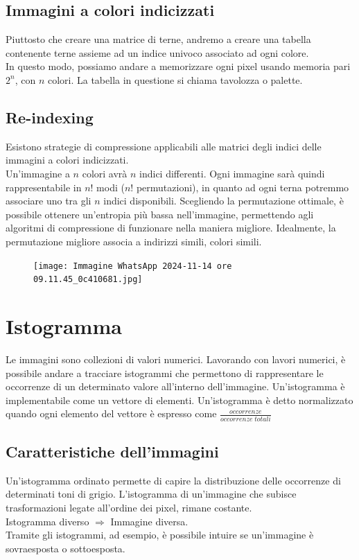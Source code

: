 \documentclass{report}
\begin{document}
	\section{Immagini a colori indicizzati}
	Piuttosto che creare una matrice di terne, andremo a creare una tabella contenente terne assieme ad un indice univoco associato ad ogni colore.\\
	In questo modo, possiamo andare a memorizzare ogni pixel usando memoria pari $2^n$, con $n$ colori.
	La tabella in questione si chiama tavolozza o palette.
	\section{Re-indexing}
	Esistono strategie di compressione applicabili alle matrici degli indici delle immagini a colori indicizzati.\\
	Un'immagine a $n$ colori avrà $n$ indici differenti.
	Ogni immagine sarà quindi rappresentabile in $n!$ modi ($n!$ permutazioni), in quanto ad ogni terna potremmo associare uno tra gli $n$ indici disponibili.
	Scegliendo la permutazione ottimale, è possibile ottenere un'entropia più bassa nell'immagine, permettendo agli algoritmi di compressione di funzionare nella maniera migliore.
	Idealmente, la permutazione migliore associa a indirizzi simili, colori simili.
	\begin{figure}[htp]
		\centering
		\texttt{[image: Immagine WhatsApp 2024-11-14 ore 09.11.45\_0c410681.jpg]}
	\end{figure}
	\newpage
	\chapter{Istogramma}
	Le immagini sono collezioni di valori numerici.
	Lavorando con lavori numerici, è possibile andare a tracciare istogrammi che permettono di rappresentare le occorrenze di un determinato valore all'interno dell'immagine.
	Un'istogramma è implementabile come un vettore di elementi.
	Un'istogramma è detto normalizzato quando ogni elemento del vettore è espresso come $\frac{occorrenze}{occorrenze \; totali}$
	\section{Caratteristiche dell'immagini}
	Un'istogramma ordinato permette di capire la distribuzione delle occorrenze di determinati toni di grigio.
	L'istogramma di un'immagine che subisce trasformazioni legate all'ordine dei pixel, rimane costante.\\
	Istogramma diverso $\Rightarrow$ Immagine diversa.\\
	Tramite gli istogrammi, ad esempio, è possibile intuire se un'immagine è sovraesposta o sottoesposta.
\end{document}
